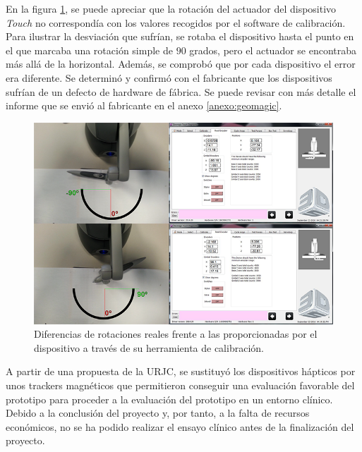 En la figura \ref{fig:errorhaptic}, se puede apreciar que la rotación del actuador del dispositivo \emph{Touch}  no correspondía con los valores recogidos por el software de calibración. Para ilustrar la desviación que sufrían, se rotaba el dispositivo hasta el punto en el que marcaba una rotación simple de $90$ grados, pero el actuador se encontraba más allá de la horizontal. Además, se comprobó que por cada dispositivo el error era diferente. Se determinó y confirmó con el fabricante que los dispositivos sufrían de un defecto de hardware de fábrica. Se puede revisar con más detalle el informe que se envió al fabricante en el anexo \ref{anexo:geomagic}.


\begin{figure}[ht]
\centering
\includegraphics[width=0.9\linewidth]{IMG/errorhaptic.png}
\caption{\label{fig:errorhaptic}Diferencias de rotaciones reales frente a las proporcionadas por el dispositivo a través de su herramienta de calibración.}
\end{figure}



A partir de una propuesta de la \ac{URJC}, se sustituyó los dispositivos hápticos por unos \acs{tracker}s magnéticos que permitieron conseguir una evaluación favorable del prototipo para proceder a la evaluación del prototipo en un entorno clínico. Debido a la conclusión del proyecto y, por tanto, a la falta de recursos económicos, no se ha podido realizar el ensayo clínico antes de la finalización del proyecto.




